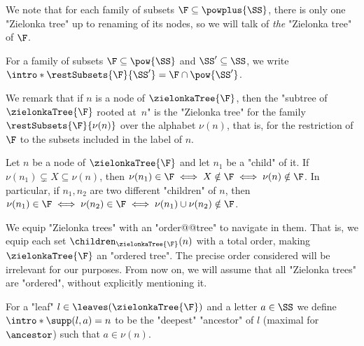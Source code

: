 \documentclass{theoretics}
\begin{document}

\begin{remark}
	We note that for each family of subsets $\F\subseteq\powplus{\SS}$, there is only one "Zielonka tree" up to renaming of its nodes, so we will talk of \emph{the} "Zielonka tree" of $\F$.
\end{remark}

\AP For a family of subsets $\F\subseteq \pow{\SS}$ and $\SS'\subseteq \SS$, we write $\intro*\restSubsets{\F}{\SS'} = \F \cap \pow{\SS'}$.

\begin{remark}
	We remark that if $n$ is a node of $\zielonkaTree{\F}$, then the "subtree of~$\zielonkaTree{\F}$ rooted at~$n$" is the "Zielonka tree" for the family $\restSubsets{\F}{\nu(n)}$ over the alphabet $\nu(n)$, that is, for the restriction of $\F$ to the subsets included in the label of $n$.
\end{remark}

\begin{remark}\label{rmk-ZT:union-changes-acceptance}
	Let $n$ be a node of $\zielonkaTree{\F}$ and let $n_1$ be a "child" of it. If $\nu(n_1) \subsetneq X \subseteq \nu(n)$, then $\nu(n_1)\in \F \iff X\notin \F \iff \nu(n)\notin \F$. In particular, if $n_1, n_2$ are two different "children" of $n$, then  
	$\nu(n_1)\in \F \iff \nu(n_2)\in \F \iff \nu(n_1)\cup \nu(n_2)\notin \F$.
\end{remark}



We equip "Zielonka trees" with an "order@@tree" to navigate in them. That is, we equip each set $\children_{\zielonkaTree{\F}}(n)$ with a total order, making $\zielonkaTree{\F}$ an "ordered tree". The precise order considered will be irrelevant for our purposes.
From now on, we will assume that all "Zielonka trees" are "ordered", without explicitly mentioning it.

\AP For a "leaf" $l \in \leaves(\zielonkaTree{\F})$ and a letter $a\in \SS$ we define $\intro*\supp(l,a) = n$ to be the "deepest" "ancestor" of $l$ (maximal for $\ancestor$) such that $a\in \nu(n)$.
\end{document}
